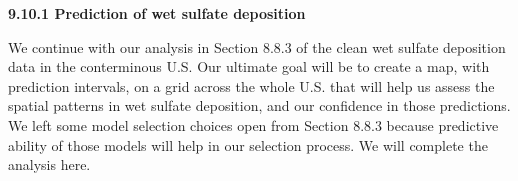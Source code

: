 \documentclass[12pt, titlepage]{article}
\begin{document}
\setcounter{equation}{0}
\renewcommand{\theequation}{R.\arabic{equation}}


%
%

{\large \textbf{9.10.1 Prediction of wet sulfate deposition}}

\vspace{.3cm}

We continue with our analysis in Section 8.8.3 of the clean wet sulfate deposition data in the conterminous U.S.  Our ultimate goal will be to create a map, with prediction intervals, on a grid across the whole U.S. that will help us assess the spatial patterns in wet sulfate deposition, and our confidence in those predictions.  We left some model selection choices open from Section 8.8.3 because predictive ability of those models will help in our selection process.  We will complete the analysis here.
\end{document}
